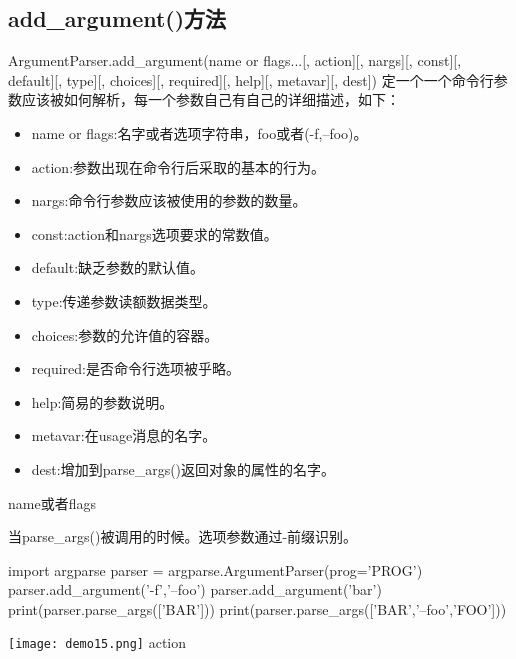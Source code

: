 \subsection{add\_argument()方法}
ArgumentParser.add\_argument(name or flags...[, action][, nargs][, const][, default][, type][, choices][, required][, help][, metavar][, dest])
定一个一个命令行参数应该被如何解析，每一个参数自己有自己的详细描述，如下：
\begin{itemize}
\item name or flags:名字或者选项字符串，foo或者(-f,--foo)。
\item action:参数出现在命令行后采取的基本的行为。
\item nargs:命令行参数应该被使用的参数的数量。
\item const:action和nargs选项要求的常数值。
\item default:缺乏参数的默认值。
\item type:传递参数读额数据类型。
\item choices:参数的允许值的容器。
\item required:是否命令行选项被乎略。
\item help:简易的参数说明。
\item metavar:在usage消息的名字。
\item dest:增加到parse\_args()返回对象的属性的名字。
\end{itemize}
name或者flags\par
当parse\_args()被调用的时候。选项参数通过-前缀识别。
\begin{python}
import argparse
parser = argparse.ArgumentParser(prog='PROG')
parser.add_argument('-f','--foo')
parser.add_argument('bar')
print(parser.parse_args(['BAR']))
print(parser.parse_args(['BAR','--foo','FOO']))
\end{python}
\texttt{[image: demo15.png]}
action\par
